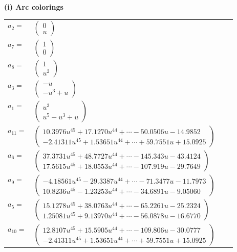 \documentclass[1p]{elsarticle_modified}
\theoremstyle{definition}
\begin{document}
\flushleft \textbf{(i) Arc colorings}\\
\begin{tabular}{m{7pt} m{180pt} m{7pt} m{180pt} }
\flushright $a_{2}=$&$\begin{pmatrix}0\\u\end{pmatrix}$ \\
\flushright $a_{7}=$&$\begin{pmatrix}1\\0\end{pmatrix}$ \\
\flushright $a_{8}=$&$\begin{pmatrix}1\\u^2\end{pmatrix}$ \\
\flushright $a_{3}=$&$\begin{pmatrix}- u\\- u^3+u\end{pmatrix}$ \\
\flushright $a_{1}=$&$\begin{pmatrix}u^3\\u^5- u^3+u\end{pmatrix}$ \\
\flushright $a_{11}=$&$\begin{pmatrix}10.3976 u^{45}+17.1270 u^{44}+\cdots-50.0506 u-14.9852\\-2.41311 u^{45}+1.53651 u^{44}+\cdots+59.7551 u+15.0925\end{pmatrix}$ \\
\flushright $a_{6}=$&$\begin{pmatrix}37.3731 u^{45}+48.7727 u^{44}+\cdots-145.343 u-43.4124\\17.5615 u^{45}+18.0553 u^{44}+\cdots-107.919 u-29.7649\end{pmatrix}$ \\
\flushright $a_{9}=$&$\begin{pmatrix}-4.18561 u^{45}-29.3387 u^{44}+\cdots-71.3477 u-11.7973\\10.8236 u^{45}-1.23253 u^{44}+\cdots-34.6891 u-9.05060\end{pmatrix}$ \\
\flushright $a_{5}=$&$\begin{pmatrix}15.1278 u^{45}+38.0763 u^{44}+\cdots-65.2261 u-25.2324\\1.25081 u^{45}+9.13970 u^{44}+\cdots-56.0878 u-16.6770\end{pmatrix}$ \\
\flushright $a_{10}=$&$\begin{pmatrix}12.8107 u^{45}+15.5905 u^{44}+\cdots-109.806 u-30.0777\\-2.41311 u^{45}+1.53651 u^{44}+\cdots+59.7551 u+15.0925\end{pmatrix}$ \\

\end{tabular}
\end{document}
